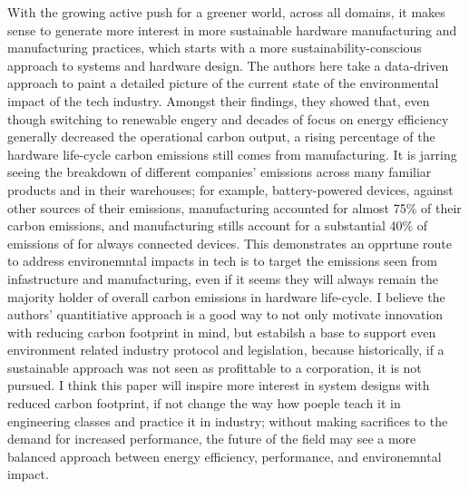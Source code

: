 \documentclass [12pt]{article}
\begin{document}
    With the growing active push for a greener world, across all domains, it makes sense to generate more interest in more sustainable hardware manufacturing and manufacturing practices, which starts with a more sustainability-conscious approach to systems and hardware design. The authors here take a data-driven approach to paint a detailed picture of the current state of the environmental impact of the tech industry. Amongst their findings, they showed that, even though switching to renewable engery and decades of focus on energy efficiency generally decreased the operational carbon output, a rising percentage of the hardware life-cycle carbon emissions still comes from manufacturing. It is jarring seeing the breakdown of different companies' emissions across many familiar products and in their warehouses; for example, battery-powered devices, against other sources of their emissions, manufacturing accounted for almost 75\% of their carbon emissions, and manufacturing stills account for a substantial 40\% of emissions of for always connected devices. This demonstrates an opprtune route to address environemntal impacts in tech is to target the emissions seen from infastructure and manufacturing, even if it seems they will always remain the majority holder of overall carbon emissions in hardware life-cycle. I believe the authors' quantitiative approach is a good way to not only motivate innovation with reducing carbon footprint in mind, but estabilsh a base to support even environment related industry protocol and legislation, because historically, if a sustainable approach was not seen as profittable to a corporation, it is not pursued. I think this paper will inspire more interest in system designs with reduced carbon footprint, if not change the way how poeple teach it in engineering classes and practice it in industry; without making sacrifices to the demand for increased performance, the future of the field may see a more balanced approach between energy efficiency, performance, and environemntal impact. 


\end{document}
